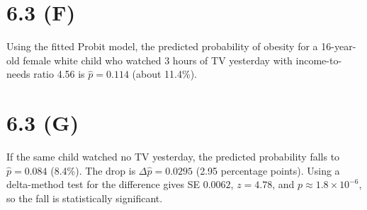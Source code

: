 \documentclass{article}
\begin{document}
\clearpage
\section*{6.3 (F)}

﻿\noindent Using the fitted Probit model, the predicted probability of obesity for a 16-year-old female white child who watched 3 hours of TV yesterday with income-to-needs ratio 4.56 is \(\hat{p}=0.114\) (about 11.4\%).

\clearpage
\section*{6.3 (G)}

﻿\noindent If the same child watched no TV yesterday, the predicted probability falls to \(\hat{p}=0.084\) (8.4\%). The drop is \(\Delta \hat{p}=0.0295\) (2.95 percentage points). Using a delta-method test for the difference gives SE \(0.0062\), \(z=4.78\), and \(p\approx1.8\times10^{-6}\), so the fall is statistically significant.
\end{document}
